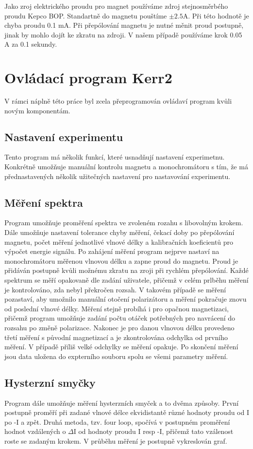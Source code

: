 Jako zroj elektrického proudu pro magnet používáme zdroj stejnosměrbého proudu Kepco BOP. Standartně do magnetu pouštíme $\pm 2.5$A. Při této hodnotě je chyba proudu 0.1 mA. Při přepólování magnetu je nutné měnit proud postupně, jinak by mohlo dojít ke zkratu na zdroji. V našem případě používáme krok 0.05 A za 0.1 sekundy.

\section{Ovládací program Kerr2}
V rámci náplně této práce byl zcela přeprogramován ovládaví program kvůli novým komponentám.

\subsection{Nastavení experimentu}
Tento program má několik funkcí, které usnadňují nastavení experimetnu. Konkrétně umožňuje manuální kontrolu magnetu a monochromátoru s tím, že má přednastavených několik užitečných nastavení pro nastavování experimentu.

\subsection{Měření spektra}
Program umožňuje proměření spektra ve zvoleném rozahu s libovolným krokem. Dále umožňuje nastavení tolerance chyby měření, čekací doby po přepólování magnetu, počet měření jednotlivé vlnové délky a kalibračních koeficientů pro výpočet energie signálu. Po zahájení měření program nejprve nastaví na monochromátoru měřenou vlnovou délku a zapne proud do magnetu. Proud je přidáván postupně kvůli možnému zkratu na zroji při rychlém přepólování. Každé spektrum se měří opakovaně dle zadání uživatele, přičemž v celém prlběhu měření je kontrolováno, zda nebyl překročen rozsah. V takovém případě se měření pozastaví, aby umožnilo manuální otočení polarizátoru a měření pokračuje znovu od poslední vlnové délky. Měření stejně probíhá i pro opačnou magnetizaci, přičemž program umožňuje zadání počtu otáček potřebných pro navrácení do rozsahu po změně polarizace. Nakonec je pro danou vlnovou délku provedeno třetí měření s původní magnetizací a je zkontrolována odchylka od prvního měření. V případě příliš velké odchylky se měření opakuje. Po skončení měření jsou data uložena do expterního souboru spolu se všemi parametry měření.

\subsection{Hysterzní smyčky}
Program dále umožňuje měření hysterzních smyček a to dvěma způsoby. První postupně proměří při zadané vlnové délce ekvidistantě různé hodnoty proudu od I po -I a zpět. Druhá metoda, tzv. four loop, spočívá v postupném proměření hodnot vzdálených o $\Delta$I od hodnoty proudu I resp -I, přičemž tato vzálenost roste se zadaným krokem. V průběhu měření je postupně vykreslován graf.
